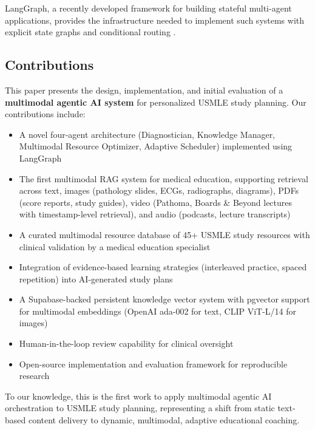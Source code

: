 LangGraph, a recently developed framework for building stateful multi-agent applications, provides the infrastructure needed to implement such systems with explicit state graphs and conditional routing \cite{langgraph2024}.

\subsection{Contributions}

This paper presents the design, implementation, and initial evaluation of a \textbf{multimodal agentic AI system} for personalized USMLE study planning. Our contributions include:

\begin{itemize}
    \item A novel four-agent architecture (Diagnostician, Knowledge Manager, Multimodal Resource Optimizer, Adaptive Scheduler) implemented using LangGraph
    \item The first multimodal RAG system for medical education, supporting retrieval across text, images (pathology slides, ECGs, radiographs, diagrams), PDFs (score reports, study guides), video (Pathoma, Boards \& Beyond lectures with timestamp-level retrieval), and audio (podcasts, lecture transcripts)
    \item A curated multimodal resource database of 45+ USMLE study resources with clinical validation by a medical education specialist
    \item Integration of evidence-based learning strategies (interleaved practice, spaced repetition) into AI-generated study plans
    \item A Supabase-backed persistent knowledge vector system with pgvector support for multimodal embeddings (OpenAI ada-002 for text, CLIP ViT-L/14 for images)
    \item Human-in-the-loop review capability for clinical oversight
    \item Open-source implementation and evaluation framework for reproducible research
\end{itemize}

To our knowledge, this is the first work to apply multimodal agentic AI orchestration to USMLE study planning, representing a shift from static text-based content delivery to dynamic, multimodal, adaptive educational coaching.
